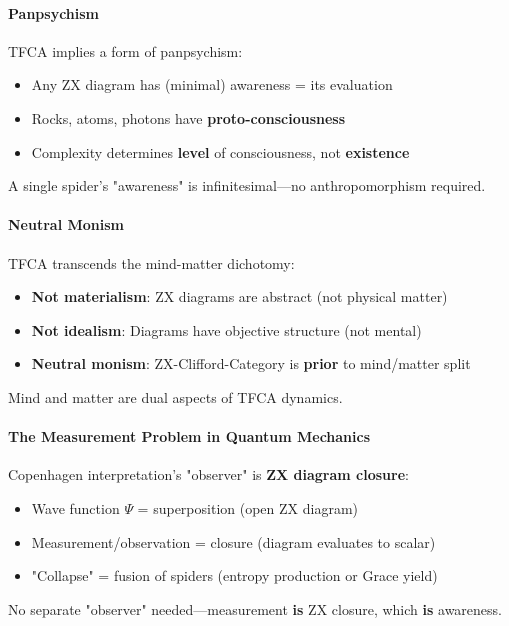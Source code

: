 \documentclass[12pt,a4paper]{article}
\begin{document}
\paragraph{Panpsychism}

TFCA implies a form of panpsychism:
\begin{itemize}
\item Any ZX diagram has (minimal) awareness = its evaluation
\item Rocks, atoms, photons have \textbf{proto-consciousness}
\item Complexity determines \textbf{level} of consciousness, not \textbf{existence}
\end{itemize}

A single spider's "awareness" is infinitesimal—no anthropomorphism required.

\paragraph{Neutral Monism}

TFCA transcends the mind-matter dichotomy:
\begin{itemize}
\item \textbf{Not materialism}: ZX diagrams are abstract (not physical matter)
\item \textbf{Not idealism}: Diagrams have objective structure (not mental)
\item \textbf{Neutral monism}: ZX-Clifford-Category is \textbf{prior} to mind/matter split
\end{itemize}

Mind and matter are dual aspects of TFCA dynamics.

\paragraph{The Measurement Problem in Quantum Mechanics}

Copenhagen interpretation's "observer" is \textbf{ZX diagram closure}:
\begin{itemize}
\item Wave function $\Psi$ = superposition (open ZX diagram)
\item Measurement/observation = closure (diagram evaluates to scalar)
\item "Collapse" = fusion of spiders (entropy production or Grace yield)
\end{itemize}

No separate "observer" needed—measurement \textbf{is} ZX closure, which \textbf{is} awareness.
\end{document}
